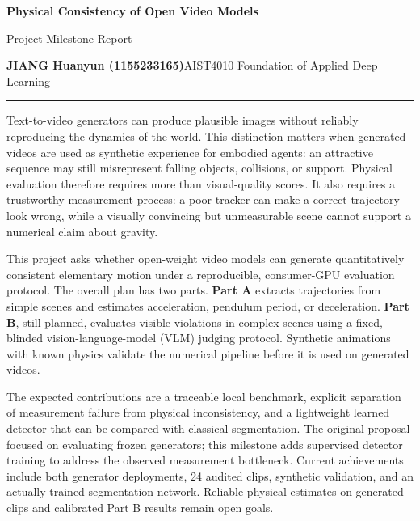 \documentclass[11pt,a4paper]{article}
\newcommand{\sect}[2]{\vspace{4pt}{\large\bfseries\color{navy}#1. #2}\par\vspace{2pt}}
\begin{document}
\fontsize{10.5}{12.4}\selectfont
\begin{center}
{\LARGE\bfseries Physical Consistency of Open Video Models}\par\vspace{3pt}
{\large Project Milestone Report}\par\vspace{5pt}
\textbf{JIANG Huanyun (1155233165)}\quad AIST4010 Foundation of Applied Deep Learning
\end{center}
\vspace{-5pt}\hrule\vspace{5pt}

\sect{1}{Introduction}
Text-to-video generators can produce plausible images without reliably reproducing
the dynamics of the world. This distinction matters when generated videos are
used as synthetic experience for embodied agents: an attractive sequence may
still misrepresent falling objects, collisions, or support. Physical evaluation
therefore requires more than visual-quality scores. It also requires a trustworthy
measurement process: a poor tracker can make a correct trajectory look wrong,
while a visually convincing but unmeasurable scene cannot support a numerical
claim about gravity.

This project asks whether open-weight video models can generate quantitatively
consistent elementary motion under a reproducible, consumer-GPU evaluation
protocol. The overall plan has two parts. \textbf{Part A} extracts trajectories
from simple scenes and estimates acceleration, pendulum period, or deceleration.
\textbf{Part B}, still planned, evaluates visible violations in complex scenes
using a fixed, blinded vision-language-model (VLM) judging protocol. Synthetic
animations with known physics validate the numerical pipeline before it is used
on generated videos.

The expected contributions are a traceable local benchmark, explicit separation
of measurement failure from physical inconsistency, and a lightweight learned
detector that can be compared with classical segmentation. The original proposal
focused on evaluating frozen generators; this milestone adds supervised detector
training to address the observed measurement bottleneck. Current achievements
include both generator deployments, 24 audited clips, synthetic validation, and
an actually trained segmentation network. Reliable physical estimates on
generated clips and calibrated Part B results remain open goals.
\end{document}
